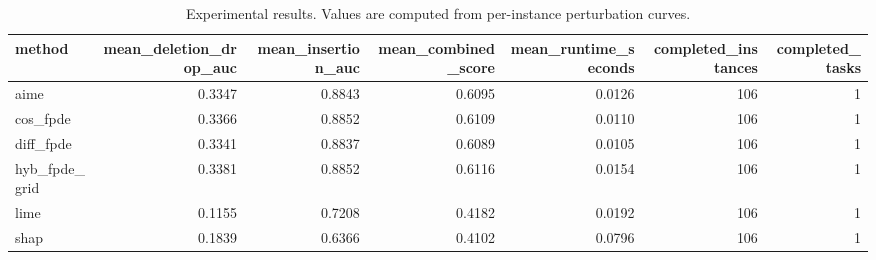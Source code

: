 \begin{table}[t]
\caption{Experimental results. Values are computed from per-instance perturbation curves.}
\label{tab:main_results_computed}
\centering
\begin{tabular}{lrrrrrr}
\toprule
method & mean\_deletion\_drop\_auc & mean\_insertion\_auc & mean\_combined\_score & mean\_runtime\_seconds & completed\_instances & completed\_tasks \\
\midrule
aime & 0.3347 & 0.8843 & 0.6095 & 0.0126 & 106 & 1 \\
cos\_fpde & 0.3366 & 0.8852 & 0.6109 & 0.0110 & 106 & 1 \\
diff\_fpde & 0.3341 & 0.8837 & 0.6089 & 0.0105 & 106 & 1 \\
hyb\_fpde\_grid & 0.3381 & 0.8852 & 0.6116 & 0.0154 & 106 & 1 \\
lime & 0.1155 & 0.7208 & 0.4182 & 0.0192 & 106 & 1 \\
shap & 0.1839 & 0.6366 & 0.4102 & 0.0796 & 106 & 1 \\
\bottomrule
\end{tabular}

\end{table}
